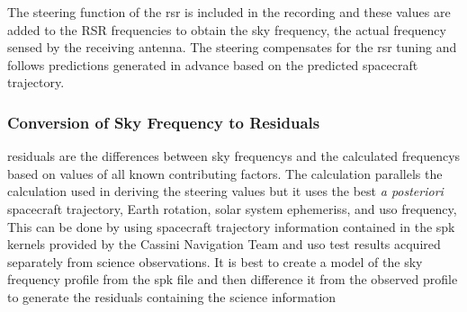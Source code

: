 \documentclass{article}
\begin{document}
            The \gls{steering function} of the \gls{rsr} is included in the recording and these values are added to the RSR frequencies to obtain the sky frequency, the actual \gls{frequency} sensed by the receiving antenna. The \gls{steering} compensates for the \gls{rsr} tuning and follows predictions generated in advance based on the predicted spacecraft \gls{trajectory}.
            
            \subsubsection{\footnotesize Conversion of Sky Frequency to Residuals}
            
            \Glspl{residual} are the differences between \glspl{sky frequency} and the calculated \glspl{frequency} based on values of all known contributing factors. The calculation parallels the calculation used in deriving the \gls{steering} values but it uses the best \textit{a posteriori} spacecraft \gls{trajectory}, Earth \gls{rotation}, solar system \glspl{ephemeris}, and \gls{uso} \gls{frequency}, This can be done by using spacecraft trajectory information contained in the \gls{spk} \glspl{kernel} provided by the Cassini Navigation Team and \gls{uso} test results acquired separately from science observations. It is best to create a model of the \gls{sky frequency} profile from the \gls{spk} file and then difference it from the observed profile to generate the residuals containing the science information
\end{document}
